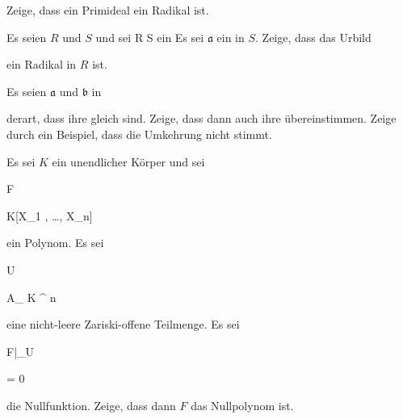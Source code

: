 {} {}




{}


{


Zeige, dass ein
Primideal
 ein
Radikal
 ist.


}


{} {}




{}


{


Es seien $R$ und $S$
und sei
\maabb {\varphi} { R } { S
} {}
ein
Es sei ${\mathfrak a}$ ein
in $S$. Zeige, dass das Urbild


 ein Radikal in $R$ ist.


}


{} {}




{}


{


Es seien ${\mathfrak a}$ und ${\mathfrak b}$
in


 derart, dass ihre
gleich sind. Zeige, dass dann auch ihre
übereinstimmen. Zeige durch ein Beispiel, dass die Umkehrung nicht stimmt.


}


{} {}




{}


{


Es sei $K$ ein unendlicher Körper und sei


\mavergleichskette


{\vergleichskette


{ F
}


{ \in }{ K[X_1 , \ldots , X_n]
}


{  }{
}


{    }{
}


{   }{
}


}
{}{}{}
ein Polynom. Es sei


\mavergleichskette


{\vergleichskette


{ U
}


{ \subseteq }{ { {\mathbb A}_{ K }^{ n  } }
}


{  }{
}


{    }{
}


{   }{
}


}
{}{}{}
eine nicht-leere Zariski-offene Teilmenge. Es sei


\mavergleichskette


{\vergleichskette


{  F|_{U}
}


{ = }{ 0
}


{  }{
}


{    }{
}


{   }{
}


}
{}{}{}
die Nullfunktion. Zeige, dass dann $F$ das Nullpolynom ist.


}



